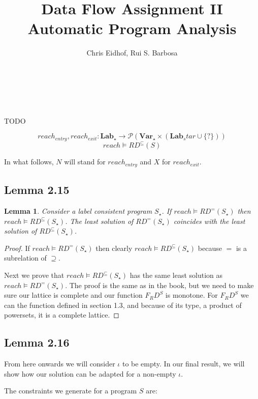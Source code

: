 \documentclass[a4wide,12pt]{article}
\theoremstyle{definition}
\theoremstyle{plain}
\newtheorem{lemma}[theo]{Lemma}
\theoremstyle{remark}
\def\pset#1{\mathcal{P}(#1)}
\def\Lab {\mathbf{Lab}}
\def\Var {\mathbf{Var}}
\def\rdsub{RD^\subseteq(S_\star)}
\begin{document}
\author{Chris Eidhof, Rui S. Barbosa}
\title{Data Flow Assignment II \\ Automatic Program Analysis}
 
\maketitle

\section{~}
TODO

\[reach_{entry}, reach_{exit} : \Lab_\star \to \pset{\Var_\star \times (\Lab_star \cup \{?\})}\]
\[reach \models RD^{\subseteq}(S)\]

In what follows, $N$ will stand for $reach_{entry}$ and $X$ for $reach_{exit}$. 


\subsection{Lemma 2.15}

\begin{lemma}
Consider a label consistent program $S_\star$.  If $reach \models RD^=(S_\star)$
then $reach \models \rdsub$. The least solution of $RD^=(S_\star)$ coincides
with the least solution of $\rdsub$.
\end{lemma}
\begin{proof}
If $reach \models RD^=(S_\star)$
then clearly $reach \models \rdsub$ because $=$ is a subrelation of $\supseteq$.

Next we prove that $reach \models \rdsub$ has the same least solution
as  $reach \models RD^=(S_\star)$. The proof is the same as in the book, but we
need to make sure our lattice is complete and our function $F_RD^S$ is monotone.
For $F_RD^S$ we can the function defined in section 1.3, and because of its
type, a product of powersets, it is a complete lattice.
\end{proof}


\subsection{Lemma 2.16}

From here onwards we will consider $\iota$ to be empty. In our final result, we
will show how our solution can be adapted for a non-empty $\iota$.

The constraints we generate for a program $S$ are:
\end{document}

